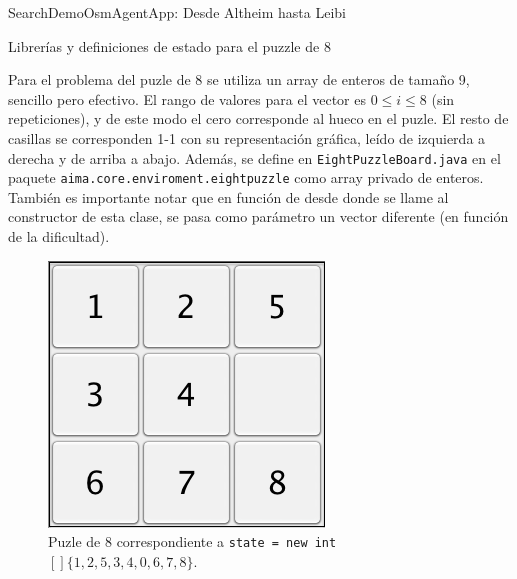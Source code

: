 \documentclass[11pt, a4paper, spanish, openright, twoside]{book}
\begin{document}
\begin{section}{SearchDemoOsmAgentApp: Desde Altheim hasta Leibi}


\end{section}


\begin{section}{Librerías y definiciones de estado para el puzzle de 8 }

Para el problema del puzle de 8 se utiliza un array de enteros de tamaño 9, sencillo pero efectivo. El rango de valores para el vector es $0\le i \le 8$ (sin repeticiones), y de este modo el cero corresponde al hueco en el puzle. El resto de casillas se corresponden 1-1 con su representación gráfica, leído de izquierda a derecha y de arriba a abajo. Además, se define en \texttt{EightPuzzleBoard.java} en el paquete \texttt{aima.core.enviroment.eightpuzzle} como array privado de enteros. También es importante notar que en función de desde donde se llame al constructor de esta clase, se pasa como parámetro un vector diferente (en función de la dificultad). 

\begin{figure}[!h]
		\begin{center}
			\includegraphics[scale=0.65]{puzle8}
			\caption{Puzle de 8 correspondiente a \texttt{state = new int$[] \{ 1, 2, 5, 3, 4, 0, 6, 7, 8 \}$}.}
		\end{center}
	\end{figure}
\end{section}
\end{document}
